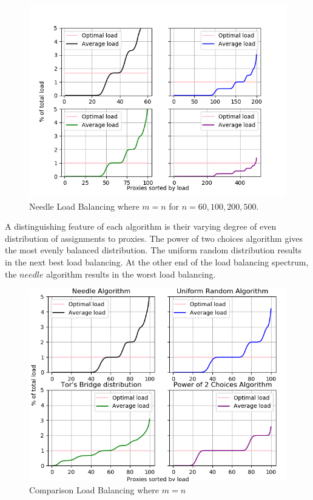 \begin{figure}[h!]
\centering
     \includegraphics[width=1.0\textwidth]{fig/load_balance_needle_to_n_60_100_200_500.png}
    \caption{Needle Load Balancing where $m=n$ for $n=60, 100, 200, 500$.}

    \label{fig:needlelb1}
\end{figure}


A distinguishing feature of each algorithm is their varying degree of even distribution of assignments to proxies. The power of two choices algorithm gives the most evenly balanced distribution. The uniform random distribution results in the next best load balancing. At the other end of the load balancing spectrum, the $needle$ algorithm results in the worst load balancing.

\begin{figure}[h!]
\centering
     \includegraphics[width=1.0\textwidth]{fig/load_balance_comparison_to_n_100.png}
    \caption{Comparison Load Balancing where $m=n$}

    \label{fig:compare1}
\end{figure}

